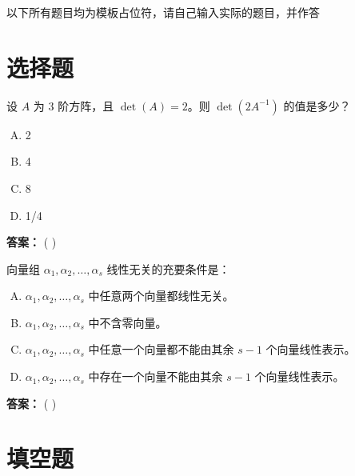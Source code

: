 \documentclass[a4paper, 12pt]{ctexart}
\begin{document}
\makeHomeworkTitle

\begin{tcolorbox}[
    hintstyle,
    colframe=winered, 
    colback=winered!5!white, 
    colbacktitle=winered, 
    fontupper=\bfseries, 
    title={\textbf{重要说明}}
]
    以下所有题目均为模板占位符，请自己输入实际的题目，并作答
\end{tcolorbox}


\section{选择题}

\begin{exercise}
    设 $A$ 为 3 阶方阵，且 $\det(A) = 2$。则 $\det(2A^{-1})$ 的值是多少？
    \begin{enumerate}[A.]
        \item 2
        \item 4
        \item 8
        \item 1/4
    \end{enumerate}
\end{exercise}
\noindent\textbf{答案：} (       )

\vspace{0.5cm}

\begin{exercise}
    向量组 $\alpha_1, \alpha_2, \dots, \alpha_s$ 线性无关的充要条件是：
    \begin{enumerate}[A.]
        \item $\alpha_1, \alpha_2, \dots, \alpha_s$ 中任意两个向量都线性无关。
        \item $\alpha_1, \alpha_2, \dots, \alpha_s$ 中不含零向量。
        \item $\alpha_1, \alpha_2, \dots, \alpha_s$ 中任意一个向量都不能由其余 $s-1$ 个向量线性表示。
        \item $\alpha_1, \alpha_2, \dots, \alpha_s$ 中存在一个向量不能由其余 $s-1$ 个向量线性表示。
    \end{enumerate}
\end{exercise}
\noindent\textbf{答案：} (       )

\vspace{1cm}

\section{填空题}
\end{document}
